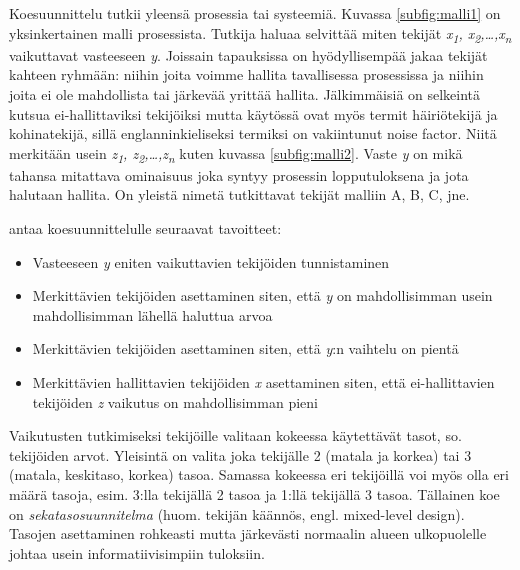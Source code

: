 \documentclass[12pt,a4paper,finnish]{tutthesis}
\begin{document}
Koesuunnittelu tutkii yleensä prosessia tai systeemiä. Kuvassa \ref{subfig:malli1}
on yksinkertainen malli prosessista. Tutkija haluaa selvittää miten tekijät
\textit{x\textsubscript{1}, x\textsubscript{2},\ldots,x\textsubscript{n}}
vaikuttavat vasteeseen \textit{y}.
Joissain tapauksissa on hyödyllisempää
jakaa tekijät kahteen ryhmään: niihin joita voimme hallita tavallisessa
prosessissa ja niihin joita ei ole mahdollista tai järkevää yrittää
hallita. Jälkimmäisiä on selkeintä kutsua ei-hallittaviksi tekijöiksi
mutta käytössä ovat myös termit häiriötekijä ja kohinatekijä, sillä englanninkieliseksi
termiksi on vakiintunut noise factor.
Niitä merkitään usein
\textit{z\textsubscript{1}, z\textsubscript{2},\ldots,z\textsubscript{n}} kuten
kuvassa \ref{subfig:malli2}.
Vaste \textit{y} on mikä tahansa mitattava ominaisuus joka syntyy prosessin
lopputuloksena ja jota halutaan hallita.
On yleistä nimetä tutkittavat tekijät malliin A, B, C, jne.

\textcite[s.~3]{Montgomery2012} antaa koesuunnittelulle
seuraavat tavoitteet:

\begin{itemize}
\item Vasteeseen \textit{y} eniten vaikuttavien tekijöiden tunnistaminen
\item Merkittävien tekijöiden asettaminen siten, että \textit{y} on mahdollisimman usein
	mahdollisimman lähellä haluttua arvoa
\item Merkittävien tekijöiden asettaminen siten, että \textit{y}:n vaihtelu on pientä
\item Merkittävien hallittavien tekijöiden \textit{x} asettaminen siten, että
	ei-hallittavien tekijöiden \textit{z} vaikutus on mahdollisimman pieni
\end{itemize}

Vaikutusten tutkimiseksi tekijöille valitaan kokeessa käytettävät tasot, so.
tekijöiden arvot. Yleisintä on valita joka tekijälle 2 (matala ja korkea) tai
3 (matala, keskitaso, korkea) tasoa.
Samassa kokeessa eri tekijöillä voi myös olla eri määrä tasoja, esim. 3:lla tekijällä
2 tasoa ja 1:llä tekijällä 3 tasoa. Tällainen koe on
\textit{sekatasosuunnitelma} (huom. tekijän käännös, engl.
mixed-level design).
Tasojen asettaminen rohkeasti mutta
järkevästi normaalin alueen ulkopuolelle johtaa usein informatiivisimpiin
tuloksiin.
\end{document}
